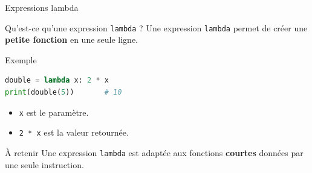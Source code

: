 \documentclass[10pt, xcolor={svgnames}]{beamer}
\begin{document}
\begin{frame}[fragile]{Expressions lambda}
	
	\begin{block}{Qu'est-ce qu'une expression \texttt{lambda} ?}
		Une expression \texttt{lambda} permet de créer une
		\textbf{petite fonction} en une seule ligne.
	\end{block}
	
	\vspace{0.4cm}
	
	\begin{exampleblock}{Exemple}
		\begin{lstlisting}[language=Python]
double = lambda x: 2 * x
print(double(5))       # 10
		\end{lstlisting}
	\end{exampleblock}
	
	\vspace{0.3cm}
	
	\begin{itemize}
		\item \texttt{x} est le paramètre.
		\item \texttt{2 * x} est la valeur retournée.
	\end{itemize}
	
	\begin{alertblock}{À retenir}
		Une expression  \texttt{lambda} est adaptée aux fonctions \textbf{courtes}
		données par une seule instruction. 
	\end{alertblock}
	
\end{frame}
\end{document}
